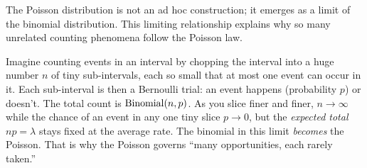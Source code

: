 The Poisson distribution is not an ad hoc construction; it emerges as a limit of the
binomial distribution. This limiting relationship explains why so many unrelated
counting phenomena follow the Poisson law.

\begin{intuitionbox}
Imagine counting events in an interval by chopping the interval into a huge number
$n$ of tiny sub-intervals, each so small that at most one event can occur in it.
Each sub-interval is then a Bernoulli trial: an event happens (probability $p$) or
doesn't. The total count is $\operatorname{Binomial}(n, p)$. As you slice finer and finer,
$n \to \infty$ while the chance of an event in any one tiny slice
$p \to 0$, but the \emph{expected total} $np = \lambda$ stays fixed at the average
rate. The binomial in this limit \emph{becomes} the Poisson. That is why the
Poisson governs ``many opportunities, each rarely taken.''
\end{intuitionbox}


